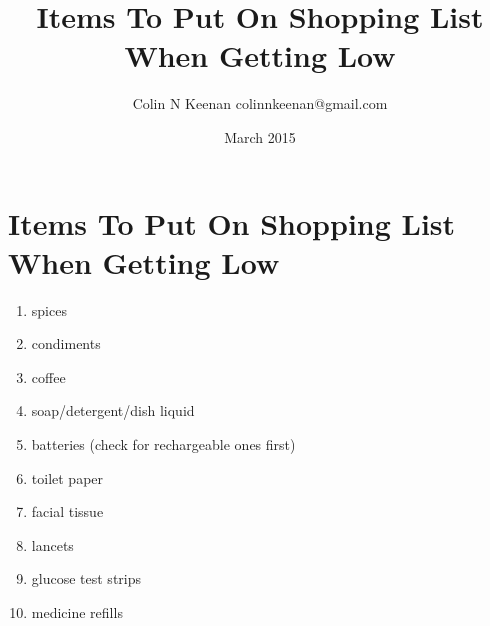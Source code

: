 \documentclass[12pt,letterpaper]{article}
\newcommand{\mytitle}{Items To Put On Shopping List When Getting Low}
\begin{document}
\title{\mytitle{}}
\author{Colin N Keenan colinnkeenan@gmail.com}
\date{March 2015}
\section*{\mytitle{}}
\begin{enumerate}
	\item spices
	\item condiments
	\item coffee
	\item soap/detergent/dish liquid
	\item batteries (check for rechargeable ones first)
	\item toilet paper
	\item facial tissue
	\item lancets
	\item glucose test strips
	\item medicine refills
\end{enumerate}
\end{document}
